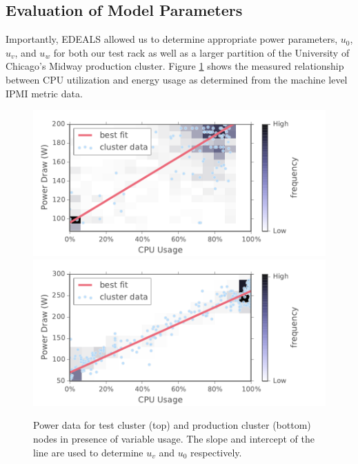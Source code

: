 \documentclass[letterpaper,twocolumn,10pt]{article}
\begin{document}
\subsection{Evaluation of Model Parameters}

Importantly, EDEALS allowed us to determine appropriate power parameters, $u_0$, $u_v$, and $u_w$ for both our test rack as well as a larger partition of the University of Chicago's Midway production cluster.  Figure \ref{pwr_proc} shows the measured relationship between CPU utilization and energy usage as determined from the machine level IPMI metric data.


\begin{figure}[t]
	\begin{center}
		\includegraphics[scale=0.55]{pwr_proc}
		\includegraphics[scale=0.55]{pwr_proc_c}
	\end{center}
	\caption{Power data for test cluster (top) and production cluster (bottom) nodes in presence of variable usage. The slope and intercept of the line are used to determine $u_v$ and $u_0$ respectively. }
	\label{pwr_proc}
\end{figure}
\end{document}
